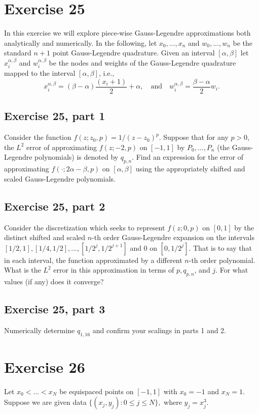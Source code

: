 \newpage
\section{Exercise 25}
In this exercise we will explore piece-wise Gauss-Legendre approximations both analytically and numerically. In the following, let $x_0, ..., x_n$ and $w_0, ..., w_n$ be the standard $n+1$ point Gauss-Legendre quadrature. Given an interval $[\alpha, \beta]$ let $x_i^{\alpha, \beta}$ and $w_i^{\alpha, \beta}$ be the nodes and weights of the Gauss-Legendre quadrature mapped to the interval $[\alpha, \beta]$, i.e.,
\[x_i^{\alpha, \beta} = (\beta- \alpha)\frac{(x_i + 1)}{2} + \alpha, \quad \text{and}\quad w_i^{\alpha, \beta} = \frac{\beta - \alpha}{2}w_i.\]
\subsection{Exercise 25, part 1}
Consider the function $f(z; z_0, p) = 1/(z - z_0)^p$. Suppose that for any $p > 0$, the $L^2$ error of approximating $f(z;-2, p)$ on $[-1, 1]$ by $P_0, ..., P_n$ (the Gauss-Legendre polynomials) is denoted by $q_{p, n}$. Find an expression for the error of approximating $f(\cdot; 2\alpha - \beta, p)$ on $[\alpha, \beta]$ using the appropriately shifted and scaled Gauss-Legendre polynomials.

\newpage
\subsection{Exercise 25, part 2}
Consider the discretization which seeks to represent $f(z;0, p)$ on $[0, 1]$ by the distinct shifted and scaled $n$-th order Gauss-Legendre expansion on the intervals $[1/2, 1], [1/4, 1/2], ..., [1/2^j, 1/2^{j+1}]$ and 0 on $[0, 1/2^j]$. That is to say that in each interval, the function approximated by a different $n$-th order polynomial. What is the $L^2$ error in this approximation in terms of $p, q_{p, n}$, and $j$. For what values (if any) does it converge?

\newpage
\subsection{Exercise 25, part 3}
Numerically determine $q_{1, 16}$ and confirm your scalings in parts 1 and 2.

\newpage
\section{Exercise 26}
Let $x_0 < ... < x_N$ be equispaced points on $[-1, 1]$ with $x_0 = -1$ and $x_N = 1$. Suppose we are given data $\{(x_j, y_j) : 0 \leq j \leq N\}, $ where $y_j = x^3_j$.


